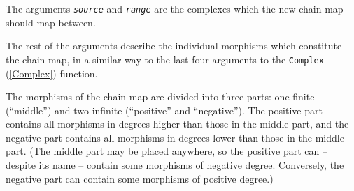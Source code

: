 \documentclass[a4paper,11pt]{report}
\begin{document}
{{{ The arguments \mbox{\texttt{\slshape source}} and \mbox{\texttt{\slshape range}} are the complexes which the new chain map should map between.

 The rest of the arguments describe the individual morphisms which constitute
the chain map, in a similar way to the last four arguments to the \texttt{Complex} (\ref{Complex}) function.

 The morphisms of the chain map are divided into three parts: one finite (``middle'') and two infinite (``positive'' and ``negative''). The positive part contains all morphisms in degrees higher than those in
the middle part, and the negative part contains all morphisms in degrees lower
than those in the middle part. (The middle part may be placed anywhere, so the
positive part can -- despite its name -- contain some morphisms of negative
degree. Conversely, the negative part can contain some morphisms of positive
degree.)

}}}
\end{document}
